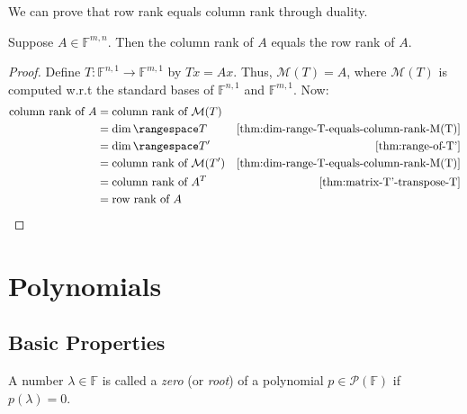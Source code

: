 \documentclass{article}
\begin{document}
We can prove that row rank equals column rank through duality.
\begin{theorem}
  Suppose $A \in \mathbb{F}^{m,n}$. Then the column rank of $A$ equals
  the row rank of $A$.
\end{theorem}
\begin{proof}
  Define $T: \mathbb{F}^{n,1} \rightarrow \mathbb{F}^{m,1}$ by $Tx =
  Ax$. Thus, $\mathcal{M}(T) = A$, where $\mathcal{M}(T)$ is computed
  w.r.t the standard bases of $\mathbb{F}^{n,1}$ and
  $\mathbb{F}^{m,1}$. Now:
  \begin{align*}
    \text{column rank of } A &= \text{column rank of } \mathcal{M}(T)
    \\
    &= \dim \rangespace T &
                            \text{\cref{thm:dim-range-T-equals-column-rank-M(T)}}
    \\
                             &= \dim \rangespace T' & \text{\cref{thm:range-of-T'}} \\
    &= \text{column rank of } \mathcal{M}(T') &
                                                  \text{\cref{thm:dim-range-T-equals-column-rank-M(T)}}
    \\
    &= \text{column rank of } A^T &
                                    \text{\cref{thm:matrix-T'-transpose-T}}
    \\
    &= \text{row rank of } A
  \end{align*}
\end{proof}


\section{Polynomials}

\subsection{Basic Properties}

\begin{definition}
  A number $\lambda \in \mathbb{F}$ is called a \textit{zero} (or
  \textit{root}) of a polynomial $p \in \mathcal{P}(\mathbb{F})$ if
  $p(\lambda) = 0$.
\end{definition}
\end{document}
